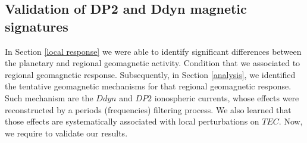 \documentclass[a4paper,fleqn]{cas-dc}
\begin{document}

\subsection{Validation of DP2 and Ddyn magnetic signatures}
\label{validation}

In Section \ref{local response} we were able to identify significant differences between the planetary and regional geomagnetic activity. Condition that we associated to regional geomagnetic response. Subsequently, in Section \ref{analysis}, we identified the tentative geomagnetic mechanisms for that regional geomagnetic response. Such mechanism are the $Ddyn$ and $DP2$ ionospheric currents, whose effects were reconstructed by a periods (frequencies) filtering process. We also learned that those effects are systematically associated with local perturbations on $TEC$. Now, we require to validate our results.
\end{document}
